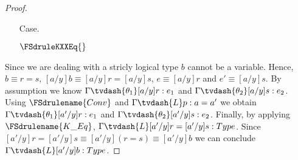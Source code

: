 \begin{proof}
\begin{itemize}
  \item[Case.] \ \\
    \begin{center}
      $\FSdruleKXXEq{}$
    \end{center}
  \end{itemize}
  Since we are dealing with a stricly logical type $b$ cannot be a variable.  Hence, 
  $b \equiv r = s$, $[a/y]b \equiv [a/y]r = [a/y]s$, $e \equiv [a/y]r$ and $e' \equiv [a/y]s$.
  By assumption we know $\Gamma \tvdash{\theta_1} [a/y]r:e_1$ and 
  $\Gamma \tvdash{\theta_2} [a/y]s:e_2$.  Using $\FSdrulename{Conv}$ and 
  $\Gamma \tvdash{L} p:a = a'$ we obtain $\Gamma \tvdash{\theta_1} [a'/y]r:e_1$ and 
  $\Gamma \tvdash{\theta_2} [a'/y]s:e_2$.  Finally, by applying $\FSdrulename{K\_Eq}$,
  $\Gamma \tvdash{L} [a'/y]r = [a'/y]s:Type$.  Since $[a'/y]r = [a'/y]s \equiv 
  [a'/y](r = s) \equiv [a'/y]b$ we can conclude $\Gamma \tvdash{L} [a'/y]b:Type$.
\end{proof}

